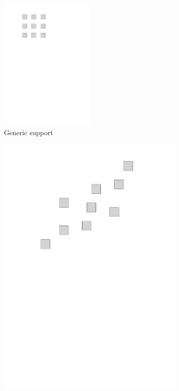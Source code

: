 \begin{figure}[!ht]
\begin{subfigure}[b]{0.32\textwidth}
	\includegraphics[width=0.5\textwidth]{figures/manual-better-support/support.pdf}
	\caption{Generic support} \label{fig_fixed_vs_expected-generic}
\end{subfigure}
\begin{subfigure}[b]{0.32\textwidth}\centering
	\includegraphics[width=\textwidth]{figures/manual-better-support/support-better.pdf}

\end{subfigure}
\end{figure}
